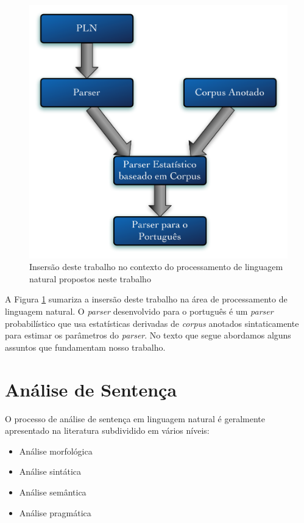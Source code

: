\begin{figure}
	\begin{center}
		\includegraphics[scale=0.5]{fases.pdf}
		\caption{\label{fases} Insersão deste trabalho no contexto do processamento de linguagem natural propostos neste trabalho}		
	\end{center}
\end{figure}

A Figura \ref{fases} sumariza a insersão deste trabalho na área de processamento de linguagem natural. O \emph{parser} desenvolvido para o português é um \emph{parser} probabilístico que usa estatísticas derivadas de \emph{corpus} anotados sintaticamente para estimar os parâmetros do \emph{parser}. No texto que segue abordamos alguns assuntos que fundamentam nosso trabalho.

\section{Análise de Sentença} %
\label{sec:analise_da_sentenca}

O processo de análise de sentença em linguagem natural é geralmente apresentado na literatura subdividido em vários níveis:

\begin{itemize}
	\item Análise morfológica
	\item Análise sintática
	\item Análise semântica
	\item Análise pragmática
\end{itemize}


